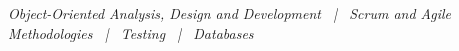 %
\emph{Object-Oriented Analysis, Design and Development \ | \ Scrum and Agile Methodologies \ | \ Testing \ | \ Databases}
